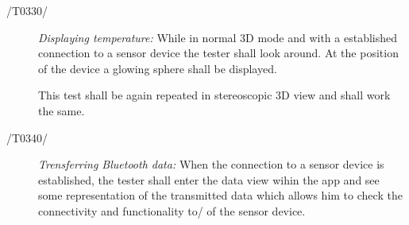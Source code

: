 \begin{description}
	\item[/T0330/]
	\textit{Displaying temperature:} While in normal 3D mode and with a established connection to a sensor device the tester shall look around. At the position of the device a glowing sphere shall be displayed.
	
	This test shall be again repeated in stereoscopic 3D view and shall work the same.
\end{description}

\begin{description}
	\item[/T0340/]
	\textit{Trensferring Bluetooth data:} When the connection to a sensor device is established, the tester shall enter the data view wihin the app and see some representation of the transmitted data which allows him to check the connectivity and functionality to/ of the sensor device.
\end{description}
